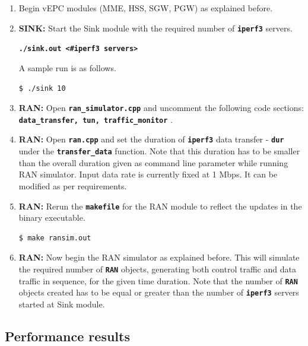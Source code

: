 \pdfminorversion=4\documentclass[hidelinks]{report}
\newcommand{\cf}[1] {
	\textbf{\texttt{#1}}
}
\begin{document}
\begin{enumerate}

\item Begin vEPC modules (MME, HSS, SGW, PGW) as explained before.

\item \textbf{SINK:} Start the Sink module with the required number of \cf{iperf3} servers.

\begin{center}

\cf{./sink.out <\#iperf3 servers>}

\end{center}

A sample run is as follows.

\begin{lstlisting}[language=bash]
$ ./sink 10
\end{lstlisting}

\item \textbf{RAN:} Open \cf{ran\_simulator.cpp} and uncomment the following code sections: \cf{data\_transfer, tun, traffic\_monitor}. 

\item \textbf{RAN:} Open \cf{ran.cpp} and set the duration of \cf{iperf3} data transfer - \cf{dur} under the \cf{transfer\_data} function. Note that this duration has to be smaller than the overall duration given as command line parameter while running RAN simulator. Input data rate is currently fixed at 1 Mbps. It can be modified as per requirements.

\item \textbf{RAN:} Rerun the \cf{makefile} for the RAN module to reflect the updates in the binary executable.

\begin{lstlisting}[language=bash]
$ make ransim.out
\end{lstlisting}

\item \textbf{RAN:} Now begin the RAN simulator as explained before. This will simulate the required number of \cf{RAN} objects, generating both control traffic and data traffic in sequence, for the given time duration. Note that the number of \cf{RAN} objects created has to be equal or greater than the number of \cf{iperf3} servers started at Sink module.

\end{enumerate}

\subsection*{Performance results}
\end{document}
